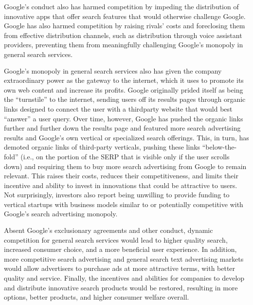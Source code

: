 \documentclass[11pt,b5paper,headings=small]{scrartcl}
\begin{document}

Google’s conduct also has harmed competition by impeding the distribution of
innovative apps that offer search features that would otherwise challenge Google. Google has
also harmed competition by raising rivals’ costs and foreclosing them from effective distribution
channels, such as distribution through voice assistant providers, preventing them from
meaningfully challenging Google’s monopoly in general search services.


Google’s monopoly in general search services also has given the company
extraordinary power as the gateway to the internet, which it uses to promote its own web content
and increase its profits. Google originally prided itself as being the “turnstile” to the internet,
sending users off its results pages through organic links designed to connect the user with a thirdparty website that would best “answer” a user query. Over time, however, Google has pushed the
organic links further and further down the results page and featured more search advertising
results and Google’s own vertical or specialized search offerings. This, in turn, has demoted
organic links of third-party verticals, pushing these links “below-the-fold” (i.e., on the portion of
the SERP that is visible only if the user scrolls down) and requiring them to buy more search
advertising from Google to remain relevant. This raises their costs, reduces their
competitiveness, and limits their incentive and ability to invest in innovations that could be
attractive to users. Not surprisingly, investors also report being unwilling to provide funding to
vertical startups with business models similar to or potentially competitive with Google’s search
advertising monopoly.


Absent Google’s exclusionary agreements and other conduct, dynamic
competition for general search services would lead to higher quality search, increased consumer
choice, and a more beneficial user experience. In addition, more competitive search advertising
and general search text advertising markets would allow advertisers to purchase ads at more
attractive terms, with better quality and service. Finally, the incentives and abilities for
companies to develop and distribute innovative search products would be restored, resulting in
more options, better products, and higher consumer welfare overall.

\end{document}
